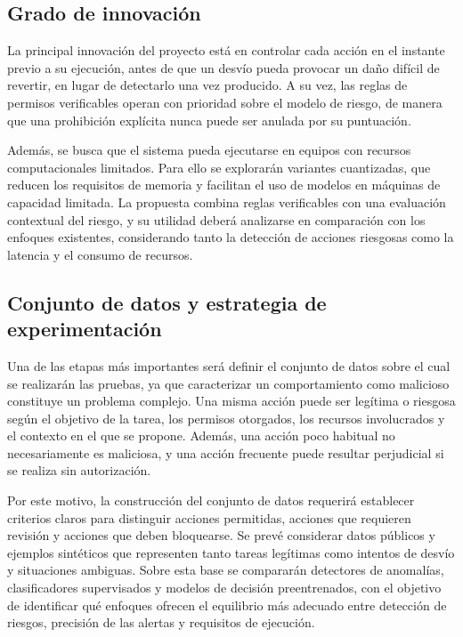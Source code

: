 \documentclass[
11pt, %
]{charter}
\begin{document}
\subsection{Grado de innovación}

La principal innovación del proyecto está en controlar cada acción en el instante previo a su ejecución, antes de que un desvío pueda provocar un daño difícil de revertir, en lugar de detectarlo una vez producido. A su vez, las reglas de permisos verificables operan con prioridad sobre el modelo de riesgo, de manera que una prohibición explícita nunca puede ser anulada por su puntuación.

Además, se busca que el sistema pueda ejecutarse en equipos con recursos computacionales limitados. Para ello se explorarán variantes cuantizadas, que reducen los requisitos de memoria y facilitan el uso de modelos en máquinas de capacidad limitada. La propuesta combina reglas verificables con una evaluación contextual del riesgo, y su utilidad deberá analizarse en comparación con los enfoques existentes, considerando tanto la detección de acciones riesgosas como la latencia y el consumo de recursos.

\subsection{Conjunto de datos y estrategia de experimentación}

Una de las etapas más importantes será definir el conjunto de datos sobre el cual se realizarán las pruebas, ya que caracterizar un comportamiento como malicioso constituye un problema complejo. Una misma acción puede ser legítima o riesgosa según el objetivo de la tarea, los permisos otorgados, los recursos involucrados y el contexto en el que se propone. Además, una acción poco habitual no necesariamente es maliciosa, y una acción frecuente puede resultar perjudicial si se realiza sin autorización.

Por este motivo, la construcción del conjunto de datos requerirá establecer criterios claros para distinguir acciones permitidas, acciones que requieren revisión y acciones que deben bloquearse. Se prevé considerar datos públicos y ejemplos sintéticos que representen tanto tareas legítimas como intentos de desvío y situaciones ambiguas. Sobre esta base se compararán detectores de anomalías, clasificadores supervisados y modelos de decisión preentrenados, con el objetivo de identificar qué enfoques ofrecen el equilibrio más adecuado entre detección de riesgos, precisión de las alertas y requisitos de ejecución.
\end{document}
